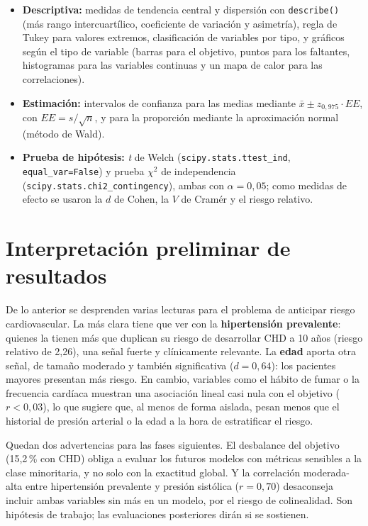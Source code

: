 \documentclass[11pt,a4paper]{article}
\begin{document}
\begin{itemize}[leftmargin=1.4em]
  \item \textbf{Descriptiva:} medidas de tendencia central y dispersión con \texttt{describe()} (más rango intercuartílico, coeficiente de variación y asimetría), regla de Tukey para valores extremos,
  clasificación de variables por tipo, y gráficos según el tipo de variable (barras para el
  objetivo, puntos para los faltantes, histogramas para las variables continuas y un mapa de calor
  para las correlaciones).
  \item \textbf{Estimación:} intervalos de confianza para las medias mediante
  $\bar{x}\pm z_{0{,}975}\cdot EE$, con $EE=s/\sqrt{n}$, y para la proporción mediante la
  aproximación normal (método de Wald).
  \item \textbf{Prueba de hipótesis:} \textit{t} de Welch (\texttt{scipy.stats.ttest\_ind},
  \texttt{equal\_var=False}) y prueba $\chi^2$ de independencia
  (\texttt{scipy.stats.chi2\_contingency}), ambas con $\alpha=0{,}05$; como medidas de efecto se usaron la $d$ de Cohen, la $V$ de Cramér y el riesgo relativo.
\end{itemize}

\section{Interpretación preliminar de resultados}

De lo anterior se desprenden varias lecturas para el problema de anticipar riesgo cardiovascular.
La más clara tiene que ver con la \textbf{hipertensión prevalente}: quienes la tienen más que duplican su riesgo de desarrollar CHD a 10 años (riesgo relativo de 2{,}26), una señal fuerte y clínicamente relevante. La \textbf{edad} aporta otra señal, de tamaño moderado y también significativa ($d=0{,}64$): los pacientes mayores presentan más riesgo. En cambio, variables como el
hábito de fumar o la frecuencia cardíaca muestran una asociación lineal casi nula con el objetivo
($r<0{,}03$), lo que sugiere que, al menos de forma aislada, pesan menos que el historial de presión
arterial o la edad a la hora de estratificar el riesgo.

Quedan dos advertencias para las fases siguientes. El desbalance del objetivo (15{,}2\,\% con CHD)
obliga a evaluar los futuros modelos con métricas sensibles a la clase minoritaria, y no solo con
la exactitud global. Y la correlación moderada-alta entre hipertensión prevalente y presión
sistólica ($r=0{,}70$) desaconseja incluir ambas variables sin más en un modelo, por el riesgo de
colinealidad. Son hipótesis de trabajo; las evaluaciones posteriores dirán si se sostienen.
\end{document}
